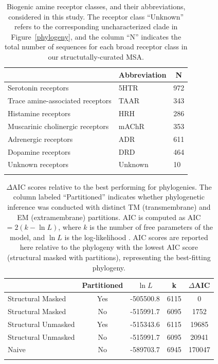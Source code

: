 \documentclass[fleqn,10pt]{wlpeerj}
\begin{document}
\begin{table}[htbp]
	\centering
	\begin{tabular}{l l l}
		\hline\noalign{\smallskip}
		\multicolumn{1}{c}{Receptor Class} & \multicolumn{1}{c}{Abbreviation} & \multicolumn{1}{c}{N} \\
		\hline\noalign{\smallskip}
		Serotonin receptors & \quad 5HTR & 972  \\
		Trace amine-associated receptors & \quad TAAR & 343 \\
		Histamine receptors & \quad HRH & 286 \\
		Muscarinic cholinergic receptors & \quad mAChR & 353  \\
		Adrenergic receptors & \quad ADR & 611  \\
		Dopamine receptors & \quad DRD & 464 \\
		Unknown receptors & \quad Unknown & 10 \\
		\noalign{\smallskip}\hline\noalign{\smallskip} 
	\end{tabular}
	\caption{\label{tab:abbrev_count} Biogenic amine receptor classes, and their abbreviations, considered in this study. The receptor class ``Unknown'' refers to the corresponding uncharacterized clade in Figure~\ref{phylogeny}, and the column ``N'' indicates the total number of sequences for each broad receptor class in our structutally-curated MSA.}
\end{table}



\vspace*{3cm}

\begin{table}[htbp]
	\centering
	\begin{tabular}{l c l l c}
		\hline\noalign{\smallskip}
		\multicolumn{1}{c}{MSA} & \multicolumn{1}{c}{Partitioned} & \multicolumn{1}{c}{$\ln L$} & \multicolumn{1}{c}{k} & \multicolumn{1}{l}{$\Delta$AIC} \\
		\hline\noalign{\smallskip}
		Structural Masked & Yes & -505500.8 & 6115 & 0 \\
		Structural Masked & No & -515991.7 & 6095 & 1752 \\  
		Structural Unmasked & Yes & -515343.6 & 6115 & 19685 \\
		Structural Unmasked & No & -515991.7 & 6095 & 20941 \\ 
		Naive & No &  -589703.7 & 6945 & 170047 \\
		\noalign{\smallskip}\hline\noalign{\smallskip} 
	\end{tabular}
	\caption{\label{tab:phylo_AIC} $\Delta$AIC scores relative to the best performing for phylogenies. The column labeled ``Partitioned'' indicates whether phylogenetic inference was conducted with distinct TM (transmembrane) and EM (extramembrane) partitions. AIC is computed as AIC $= 2(k - \ln L)$, where $k$ is the number of free parameters of the model, and $\ln L$ is the log-likelihood \citep{Akaike1974,BurnhamAnderson2004}. AIC scores are reported here relative to the phylogeny with the lowest AIC score (structural masked with partitions), representing the best-fitting phylogeny.}
\end{table}
\end{document}
